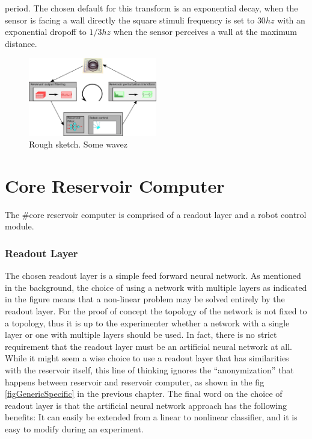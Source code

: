 period.
The chosen default for this transform is an exponential decay, when the sensor
is facing a wall directly the square stimuli frequency is set to $30hz$ with an
exponential dropoff to $1/3hz$ when the sensor perceives a wall at the maximum
distance.
\begin{figure}[h!]
  \centering
  \includegraphics[width=0.5\textwidth]{fig/RCloop.png}
  \caption{Rough sketch.
    Some wavez
  }
  \label{figDataLoop}
\end{figure}
%
\section{Core Reservoir Computer}
The #core reservoir computer is comprised of a readout layer and a robot control
module.
\subsubsection{Readout Layer}
The chosen readout layer is a simple feed forward neural network.
As mentioned in the background, the choice of using a network with multiple
layers as indicated in the figure means that a non-linear problem may be solved
entirely by the readout layer.
For the proof of concept the topology of the network is not fixed to a topology,
thus it is up to the experimenter whether a network with a single layer or one
with multiple layers should be used.
In fact, there is no strict requirement that the readout layer must be an
artificial neural network at all.
While it might seem a wise choice to use a readout layer that has similarities
with the reservoir itself, this line of thinking ignores the ``anonymization''
that happens between reservoir and reservoir computer, as shown in the fig
\ref{figGenericSpecific} in the previous chapter.
The final word on the choice of readout layer is that the artificial neural
network approach has the following benefits:
It can easily be extended from a linear to nonlinear classifier, and it is easy
to modify during an experiment.
